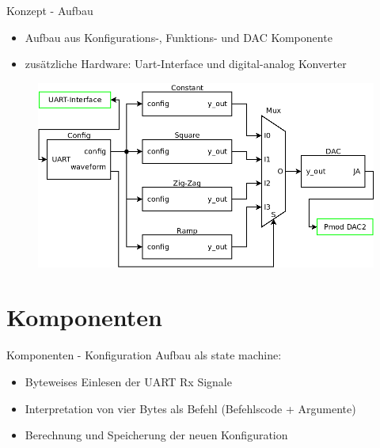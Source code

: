 \documentclass[11pt]{beamer}
\begin{document}
\begin{frame}{Konzept - Aufbau}
  \begin{itemize}
    \item Aufbau aus Konfigurations-, Funktions- und DAC Komponente
    \item zusätzliche Hardware: Uart-Interface und digital-analog Konverter
  \end{itemize}

  \begin{figure}
    \includegraphics[scale=0.36]{fg_diagram_pres}
  \end{figure}
\end{frame}

\section{Komponenten}

\begin{frame}{Komponenten - Konfiguration}
    Aufbau als state machine:
      \begin{itemize}
        \item Byteweises Einlesen der UART Rx Signale 
        \item Interpretation von vier Bytes als Befehl (Befehlscode + Argumente) 
        \item Berechnung und Speicherung der neuen Konfiguration
      \end{itemize}
      \resizebox{\textwidth}{!}{
        
      }
\end{frame}
\end{document}
